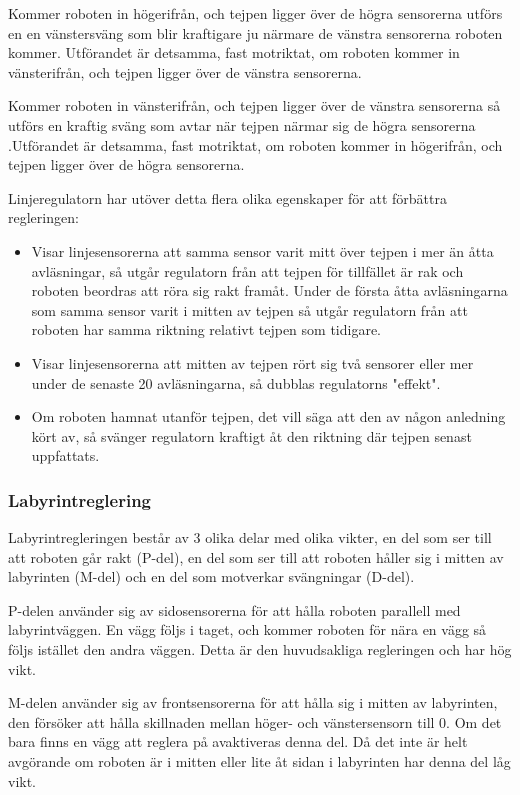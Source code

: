 Kommer roboten in högerifrån, och tejpen ligger över de högra sensorerna 
utförs en en vänstersväng som blir kraftigare ju närmare de vänstra 
sensorerna roboten kommer. Utförandet är detsamma, fast motriktat, om roboten 
kommer in vänsterifrån, och tejpen ligger över de vänstra sensorerna.

Kommer roboten in vänsterifrån, och tejpen ligger över de vänstra sensorerna 
så utförs en kraftig sväng som avtar när tejpen närmar sig de högra sensorerna
.Utförandet är detsamma, fast motriktat, om roboten kommer in högerifrån, och 
tejpen ligger över de högra sensorerna.


Linjeregulatorn har utöver detta flera olika egenskaper för att förbättra 
regleringen:
\begin{itemize}
\item Visar linjesensorerna att samma sensor varit mitt över tejpen i mer än åtta 
avläsningar, så utgår regulatorn från att tejpen för tillfället är rak och roboten 
beordras att röra sig rakt framåt. Under de första åtta avläsningarna som samma 
sensor varit i mitten av tejpen så utgår regulatorn från att roboten har samma riktning 
relativt tejpen som tidigare.
\item Visar linjesensorerna att mitten av tejpen rört sig två sensorer eller mer
 under de senaste 20 avläsningarna, så dubblas regulatorns "effekt".
\item Om roboten hamnat utanför tejpen, det vill säga att den av någon anledning 
kört av, så svänger regulatorn kraftigt åt den riktning där tejpen senast uppfattats.
\end{itemize}



\subsubsection{Labyrintreglering}
\label{sec:labyrintreglering}
Labyrintregleringen består av 3 olika delar med olika vikter,
en del som ser till att roboten går rakt (P-del), en del som ser till att
roboten håller sig i mitten av labyrinten (M-del) och en del som motverkar
svängningar (D-del).


P-delen använder sig av sidosensorerna för att hålla roboten parallell med
labyrintväggen. En vägg följs i taget, och kommer roboten för nära en vägg så
följs istället den andra väggen. Detta är den huvudsakliga regleringen och har
hög vikt.


M-delen använder sig av frontsensorerna för att hålla sig i mitten av
labyrinten, den försöker att hålla skillnaden mellan höger- och vänstersensorn
till 0. Om det bara finns en vägg att reglera på avaktiveras denna del. Då det
inte är helt avgörande om roboten är i mitten eller lite åt sidan i labyrinten
har denna del låg vikt.


